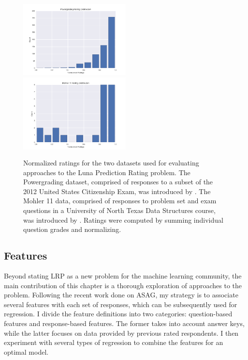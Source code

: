\begin{figure}[h]
\centerline{%
\includegraphics[width=0.5\textwidth]{figures/powerGradingDistribution.png}%
\includegraphics[width=0.5\textwidth] {figures/mohlerRatings.png}%
}%
\caption{Normalized ratings for the two datasets used for evaluating approaches to the Luna Prediction Rating problem. The Powergrading dataset, comprised of responses to a subset of the 2012 United States Citizenship Exam, was introduced by \citet{basu2013powergrading}. The Mohler 11 data, comprised of responses to problem set and exam questions in a University of North Texas Data Structures course, was introduced by \citet{mohler2011learning}. Ratings were computed by summing individual question grades and normalizing.}
\label{fig:RatingDistribution}
\end{figure}

\subsection{Features}

Beyond stating LRP as a new problem for the machine learning community, the main contribution of this chapter is a thorough exploration of approaches to the problem. Following the recent work done on ASAG, my strategy is to associate several features with each set of responses, which can be subsequently used for regression. I divide the feature definitions into two categories: question-based features and response-based features. The former takes into account answer keys, while the latter focuses on data provided by previous rated respondents. I then experiment with several types of regression to combine the features for an optimal model.

